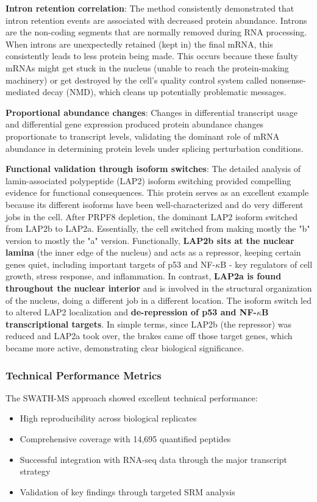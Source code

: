 \documentclass[12pt,a4paper]{article}
\begin{document}
\textbf{Intron retention correlation}: The method consistently demonstrated that intron retention events are associated with decreased protein abundance. Introns are the non-coding segments that are normally removed during RNA processing. When introns are unexpectedly retained (kept in) the final mRNA, this consistently leads to less protein being made. This occurs because these faulty mRNAs might get stuck in the nucleus (unable to reach the protein-making machinery) or get destroyed by the cell's quality control system called nonsense-mediated decay (NMD), which cleans up potentially problematic messages.

\textbf{Proportional abundance changes}: Changes in differential transcript usage and differential gene expression produced protein abundance changes proportionate to transcript levels, validating the dominant role of mRNA abundance in determining protein levels under splicing perturbation conditions.

\textbf{Functional validation through isoform switches}: The detailed analysis of lamin-associated polypeptide (LAP2) isoform switching provided compelling evidence for functional consequences. This protein serves as an excellent example because its different isoforms have been well-characterized and do very different jobs in the cell. After PRPF8 depletion, the dominant LAP2 isoform switched from LAP2b to LAP2a. Essentially, the cell switched from making mostly the "b" version to mostly the "a" version. Functionally, \textbf{LAP2b sits at the nuclear lamina} (the inner edge of the nucleus) and acts as a repressor, keeping certain genes quiet, including important targets of p53 and NF-$\kappa$B - key regulators of cell growth, stress response, and inflammation. In contrast, \textbf{LAP2a is found throughout the nuclear interior} and is involved in the structural organization of the nucleus, doing a different job in a different location. The isoform switch led to altered LAP2 localization and \textbf{de-repression of p53 and NF-$\kappa$B transcriptional targets}. In simple terms, since LAP2b (the repressor) was reduced and LAP2a took over, the brakes came off those target genes, which became more active, demonstrating clear biological significance.

\subsubsection{Technical Performance Metrics}

The SWATH-MS approach showed excellent technical performance:
\begin{itemize}
    \item High reproducibility across biological replicates
    \item Comprehensive coverage with 14,695 quantified peptides
    \item Successful integration with RNA-seq data through the major transcript strategy
    \item Validation of key findings through targeted SRM analysis
\end{itemize}
\end{document}
